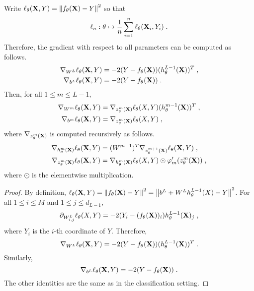 \begin{shaded}
\begin{proposition}
\label{prop:backpropagation:classif}
Write $\ell_{\theta}(\mathbf{X},Y) =  \left\|f_{\theta}(\mathbf{X}) - Y\right\|^2$ so that 
$$
\ell_n:\theta \mapsto \frac{1}{n} \sum_{i=1}^n \ell_{\theta}(\mathbf{X}_i,Y_i)\;. 
$$
Therefore, the gradient with respect to all parameters can be computed as follows.
\begin{align*}
\nabla_{W^L} \ell_{\theta}(\mathbf{X},Y) &= -2(Y - f_{\theta}(\mathbf{X}))(h^{L-1}_{\theta}(\mathbf{X}))^T\;,\\
\nabla_{b^L} \ell_{\theta}(\mathbf{X},Y) &=-2(Y - f_{\theta}(\mathbf{X}))\;.
\end{align*}
Then, for all $1\leqslant m\leqslant L-1$,
\begin{align*}
\nabla_{W^m} \ell_{\theta}(\mathbf{X},Y) &= \nabla_{z_{\theta}^m(\mathbf{X})}\ell_{\theta}(X,Y)(h_{\theta}^{m-1}(\mathbf{X}))^T\;,\\
\nabla_{b^m} \ell_{\theta}(\mathbf{X},Y) &=  \nabla_{z_{\theta}^m(\mathbf{X})}\ell_{\theta}(X,Y)\;,
\end{align*}
where $\nabla_{z_{\theta}^m(\mathbf{X})}$ is computed recursively as follows.
\begin{align*}
\nabla_{h_{\theta}^m(\mathbf{X})} \ell_{\theta}(\mathbf{X},Y) &= (W^{m+1})^T\nabla_{z_{\theta}^{m+1}(\mathbf{X})} \ell_{\theta}(\mathbf{X},Y) \;,\\
\nabla_{z_{\theta}^m(\mathbf{X})} \ell_{\theta}(\mathbf{X},Y) &= \nabla_{h_{\theta}^m(\mathbf{X})}\ell_{\theta}(X,Y) \odot \varphi_m'(z_{\theta}^{m}(\mathbf{X}))\;,
\end{align*}
where $\odot$ is the elementwise multiplication.
\end{proposition}
\end{shaded}
\begin{proof}
By definition, $\ell_{\theta}(\mathbf{X},Y) =  \left\|f_{\theta}(\mathbf{X}) - Y\right\|^2 = \left\|b^L + W^Lh_{\theta}^{L-1}(X) - Y\right\|^2$.
For all $1\leqslant i\leqslant M$ and $1\leqslant j\leqslant d_{L-1}$,
$$
\partial_{W^L_{i,j}}\ell_{\theta}(X,Y) = -2(Y_i - (f_{\theta}(\mathbf{X}))_i)h^{L-1}_{\theta}(\mathbf{X})_j\;,
$$
where $Y_i$ is the $i$-th coordinate of $Y$. Therefore,
$$
\nabla_{W^L} \ell_{\theta}(\mathbf{X},Y) = -2(Y - f_{\theta}(\mathbf{X}))(h^{L-1}_{\theta}(\mathbf{X}))^T\;.
$$
Similarly, 
$$
\nabla_{b^L} \ell_{\theta}(\mathbf{X},Y) =-2(Y - f_{\theta}(\mathbf{X}))\;.
$$
The other identities are the same as in the classification setting.
\end{proof}

